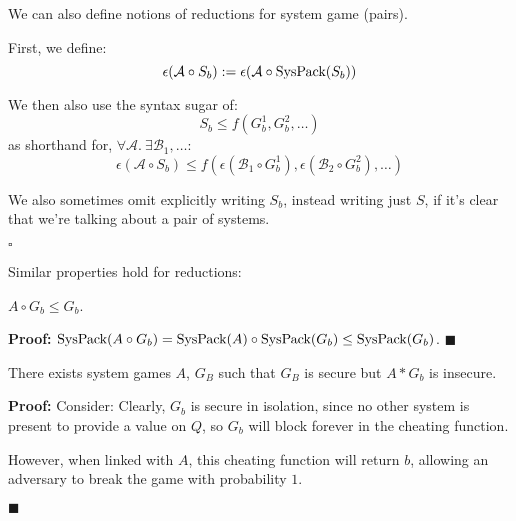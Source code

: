 \begin{definition}
We can also define notions of reductions for system game (pairs).

First, we define:
$$
\epsilon(\mathcal{A} \circ S_b) := \epsilon(\mathcal{A} \circ \text{SysPack}(S_b))
$$

We then also use the syntax sugar of:
$$
S_b \leq f(G_b^1, G_b^2, \ldots)
$$
as shorthand for, $\forall \mathcal{A}.\ \exists \mathcal{B}_1, \ldots$:
$$
\epsilon(\mathcal{A} \circ S_b) \leq f(\epsilon(\mathcal{B}_1 \circ G_b^1), \epsilon(\mathcal{B}_2 \circ G_b^2), \ldots)
$$

We also sometimes omit explicitly writing $S_b$, instead writing just $S$,
if it's clear that we're talking about a pair of systems.

$\square$
\end{definition}

Similar properties hold for reductions:

\begin{lemma}
\label{thm:systemreduction}
$A \circ G_b \leq G_b$.

\textbf{Proof:} $\text{SysPack}(A \circ G_b) = \text{SysPack}(A) \circ \text{SysPack}(G_b) \leq \text{SysPack}(G_b)$. $\blacksquare$
\end{lemma}

\begin{lemma}
There exists system games $A$, $G_B$ such that $G_B$ is secure
but $A * G_b$ is insecure.

\textbf{Proof:}
Consider:
Clearly, $G_b$ is secure in isolation, since no other system is present
to provide a value on $Q$, so $G_b$ will block forever in the cheating function.

However, when linked with $A$, this cheating function will return $b$,
allowing an adversary to break the game with probability $1$.

$\blacksquare$
\end{lemma}
